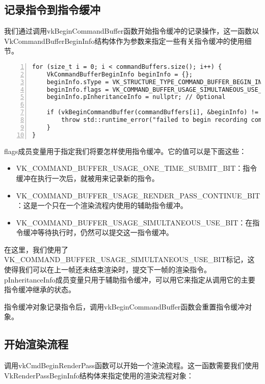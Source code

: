 \documentclass{ctexart}
\begin{document}
\subsection{记录指令到指令缓冲}

我们通过调用vkBeginCommandBuffer函数开始指令缓冲的记录操作，这一函数以VkCommandBufferBeginInfo结构体作为参数来指定一些有关指令缓冲的使用细节。

\begin{lstlisting}[language={[ANSI]C},keywordstyle=\color{blue!70},commentstyle=\color{red!50!green!50!blue!50},frame=shadowbox, rulesepcolor=\color{red!20!green!20!blue!20},basicstyle=\small,numbers=left, numberstyle=\tiny,breaklines=true]
for (size_t i = 0; i < commandBuffers.size(); i++) {
	VkCommandBufferBeginInfo beginInfo = {};
	beginInfo.sType = VK_STRUCTURE_TYPE_COMMAND_BUFFER_BEGIN_INFO;
	beginInfo.flags = VK_COMMAND_BUFFER_USAGE_SIMULTANEOUS_USE_BIT;
	beginInfo.pInheritanceInfo = nullptr; // Optional

	if (vkBeginCommandBuffer(commandBuffers[i], &beginInfo) != VK_SUCCESS) {
		throw std::runtime_error("failed to begin recording command buffer!");
	}
}
\end{lstlisting}

flags成员变量用于指定我们将要怎样使用指令缓冲。它的值可以是下面这些：

\begin{itemize}
	\item VK\_COMMAND\_BUFFER\_USAGE\_ONE\_TIME\_SUBMIT\_BIT：指令缓冲在执行一次后，就被用来记录新的指令。
	\item VK\_COMMAND\_BUFFER\_USAGE\_RENDER\_PASS\_CONTINUE\_BIT：这是一个只在一个渲染流程内使用的辅助指令缓冲。
	\item VK\_COMMAND\_BUFFER\_USAGE\_SIMULTANEOUS\_USE\_BIT：在指令缓冲等待执行时，仍然可以提交这一指令缓冲。
\end{itemize}

在这里，我们使用了VK\_COMMAND\_BUFFER\_USAGE\_SIMULTANEOUS\_USE\_BIT标记，这使得我们可以在上一帧还未结束渲染时，提交下一帧的渲染指令。pInheritanceInfo成员变量只用于辅助指令缓冲，可以用它来指定从调用它的主要指令缓冲继承的状态。

指令缓冲对象记录指令后，调用vkBeginCommandBuffer函数会重置指令缓冲对象。

\subsection{开始渲染流程}

调用vkCmdBeginRenderPass函数可以开始一个渲染流程。这一函数需要我们使用VkRenderPassBeginInfo结构体来指定使用的渲染流程对象：
\end{document}
